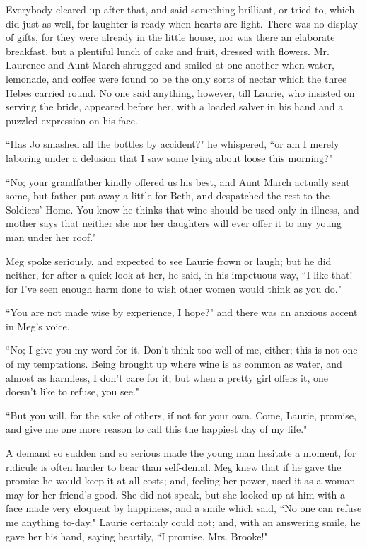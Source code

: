 Everybody cleared up after that, and said something brilliant, or tried
to, which did just as well, for laughter is ready when hearts are light.
There was no display of gifts, for they were already in the little
house, nor was there an elaborate breakfast, but a plentiful lunch of
cake and fruit, dressed with flowers. Mr. Laurence and Aunt March
shrugged and smiled at one another when water, lemonade, and coffee were
found to be the only sorts of nectar which the three Hebes carried
round. No one said anything, however, till Laurie, who insisted on
serving the bride, appeared before her, with a loaded salver in his hand
and a puzzled expression on his face.

``Has Jo smashed all the bottles by accident?" he whispered, ``or am I
merely laboring under a delusion that I saw some lying about loose this
morning?"

``No; your grandfather kindly offered us his best, and Aunt March
actually sent some, but father put away a little for Beth, and
despatched the rest to the Soldiers' Home. You know he
thinks that wine should be used only in illness, and mother says that
neither she nor her daughters will ever offer it to any young man under
her roof."

Meg spoke seriously, and expected to see Laurie frown or laugh; but he
did neither, for after a quick look at her, he said, in his impetuous
way, ``I like that! for I've seen enough harm done to
wish other women would think as you do."

``You are not made wise by experience, I hope?" and there was an anxious
accent in Meg's voice.

``No; I give you my word for it. Don't think too well of
me, either; this is not one of my temptations. Being brought up where
wine is as common as water, and almost as harmless, I
don't care for it; but when a pretty girl offers it, one
doesn't like to refuse, you see."

``But you will, for the sake of others, if not for your own. Come,
Laurie, promise, and give me one more reason to call this the happiest
day of my life."

A demand so sudden and so serious made the young man hesitate a moment,
for ridicule is often harder to bear than self-denial. Meg knew that if
he gave the promise he would keep it at all costs; and, feeling her
power, used it as a woman may for her friend's good. She
did not speak, but she looked up at him with a face made very eloquent
by happiness, and a smile which said, ``No one can refuse me anything
to-day." Laurie certainly could not; and, with an answering smile, he
gave her his hand, saying heartily, ``I promise, Mrs. Brooke!"

